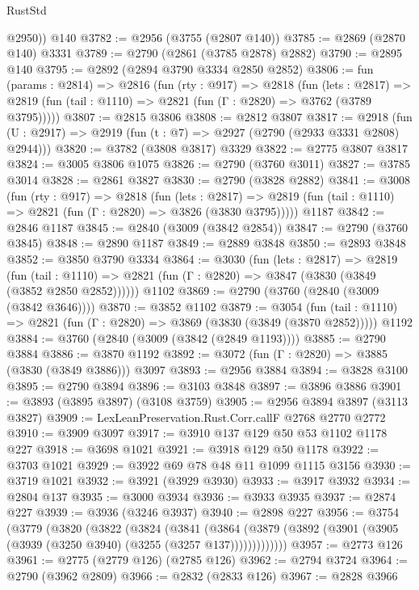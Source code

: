 \begin{lexlean}{RustStd}
\begin{coremodule}
        @2950))
    @140
@3782 := @2956 (@3755 (@2807 @140))
@3785 := @2869 (@2870 @140) @3331
@3789 := @2790 (@2861 (@3785 @2878) @2882)
@3790 := @2895 @140
@3795 := @2892 (@2894 @3790 @3334 @2850 @2852)
@3806 := fun (params : @2814) =>
  @2816
    (fun (rty : @917) =>
    @2818
      (fun (lets : @2817) =>
      @2819 (fun (tail : @1110) => @2821 (fun (Γ : @2820) => @3762 (@3789 @3795)))))
@3807 := @2815 @3806
@3808 := @2812 @3807
@3817 := @2918 (fun (U : @2917) => @2919 (fun (t : @7) => @2927 (@2790 (@2933 @3331 @2808) @2944)))
@3820 := @3782 (@3808 @3817) @3329
@3822 := @2775 @3807 @3817
@3824 := @3005 @3806 @1075
@3826 := @2790 (@3760 @3011)
@3827 := @3785 @3014
@3828 := @2861 @3827
@3830 := @2790 (@3828 @2882)
@3841 := @3008
    (fun (rty : @917) =>
    @2818
      (fun (lets : @2817) =>
      @2819 (fun (tail : @1110) => @2821 (fun (Γ : @2820) => @3826 (@3830 @3795)))))
    @1187
@3842 := @2846 @1187
@3845 := @2840 (@3009 (@3842 @2854))
@3847 := @2790 (@3760 @3845)
@3848 := @2890 @1187
@3849 := @2889 @3848
@3850 := @2893 @3848
@3852 := @3850 @3790 @3334
@3864 := @3030
    (fun (lets : @2817) =>
    @2819
      (fun (tail : @1110) => @2821 (fun (Γ : @2820) => @3847 (@3830 (@3849 (@3852 @2850 @2852))))))
    @1102
@3869 := @2790 (@3760 (@2840 (@3009 (@3842 @3646))))
@3870 := @3852 @1102
@3879 := @3054
    (fun (tail : @1110) => @2821 (fun (Γ : @2820) => @3869 (@3830 (@3849 (@3870 @2852)))))
    @1192
@3884 := @3760 (@2840 (@3009 (@3842 (@2849 @1193))))
@3885 := @2790 @3884
@3886 := @3870 @1192
@3892 := @3072 (fun (Γ : @2820) => @3885 (@3830 (@3849 @3886))) @3097
@3893 := @2956 @3884
@3894 := @3828 @3100
@3895 := @2790 @3894
@3896 := @3103 @3848
@3897 := @3896 @3886
@3901 := @3893 (@3895 @3897) (@3108 @3759)
@3905 := @2956 @3894 @3897 (@3113 @3827)
@3909 := LexLeanPreservation.Rust.Corr.callF @2768 @2770 @2772
@3910 := @3909 @3097
@3917 := @3910 @137 @129 @50 @53 @1102 @1178 @227
@3918 := @3698 @1021
@3921 := @3918 @129 @50 @1178
@3922 := @3703 @1021
@3929 := @3922 @69 @78 @48 @11 @1099 @1115 @3156
@3930 := @3719 @1021
@3932 := @3921 (@3929 @3930)
@3933 := @3917 @3932
@3934 := @2804 @137
@3935 := @3000 @3934
@3936 := @3933 @3935
@3937 := @2874 @227
@3939 := @3936 (@3246 @3937)
@3940 := @2898 @227
@3956 := @3754
    (@3779
      (@3820
        (@3822
          (@3824
            (@3841
              (@3864
                (@3879 (@3892 (@3901 (@3905 (@3939 (@3250 @3940) (@3255 (@3257 @137)))))))))))))
@3957 := @2773 @126
@3961 := @2775 (@2779 @126) (@2785 @126)
@3962 := @2794 @3724
@3964 := @2790 (@3962 @2809)
@3966 := @2832 (@2833 @126)
@3967 := @2828 @3966

\end{coremodule}
\end{lexlean}
